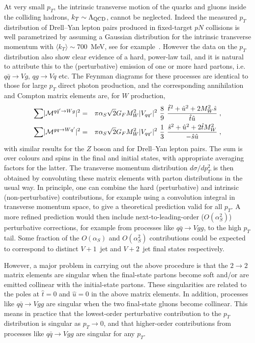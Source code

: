 \documentclass[12pt]{iopart}
\def\beqn{\begin{eqnarray}}
\def\eeqn{\end{eqnarray}}
\def\as{\alpha_S}
\begin{document}
At very small $p_T$, the intrinsic transverse motion of the quarks and gluons inside the colliding hadrons, $k_T
\sim \Lambda_{\rm QCD}$,  cannot be neglected. Indeed the measured $p_T$ distribution of Drell--Yan lepton pairs
produced in fixed-target $pN$ collisions is well parametrized by assuming a Gaussian distribution for the
intrinsic transverse momentum with  $\langle k_T\rangle \sim 700$~MeV, see for example~\cite{Ellis:1991qj}. 
However the data on the $p_T$ distribution also show clear evidence of a hard, power-law tail, and it is natural
to attribute this to the (perturbative) emission of one or more hard partons, i.e. $q \bar q \to V  g$, $q g \to
V q$ etc. The Feynman diagrams for these processes  are identical to those for large $p_T$ direct photon
production, and the corresponding annihilation and Compton matrix elements are, for $W$ production,
\beqn
\label{eq:sec2w1j}
 {\sum}\vert{\cal M}^{q\bar q'\rightarrow Wg}\vert^2  
&=& \pi\as \sqrt{2} G_F M^2_W \vert V_{qq'} \vert^2\ 
\frac{8}{9}\ {{\hat t}^2+{\hat u}^2+2 M_W^2 {\hat s} \over {\hat t} {\hat u} } \; , \nonumber \\
{\sum}\vert {\cal M}^{gq\rightarrow Wq'}\vert^2 
&=&  \pi\as \sqrt{2} G_F M^2_W \vert V_{qq'} \vert^2\  
\frac{1}{3}\ 
{{\hat s}^2+{\hat u}^2+2 {\hat t} M_W^2 \over - {\hat s} {\hat u} } \; ,
\eeqn
with similar results for the $Z$ boson and for Drell--Yan lepton pairs. The sum is over colours and spins in the
final and initial states, with appropriate averaging factors for the latter. The  transverse momentum
distribution $d\sigma/dp_T^2$  is then obtained by convoluting these matrix elements with parton distributions
in the usual way. In principle, one can combine the hard (perturbative) and intrinsic (non-perturbative)
contributions, for example using a convolution integral in transverse momentum space, to give a theoretical
prediction valid for all $p_T$. A more refined prediction would then include next-to-leading-order ($O(\as^2)$)
perturbative corrections, for example from processes like $q \bar q \to V gg$, to the high $p_T$ tail. Some
fraction of the $O(\as)$ and $O(\as^2)$ contributions could be expected to correspond to distinct $V+1$~jet and
$V+2$~jet final states respectively.

However, a major problem in carrying out the above procedure is that the $2\to 2$ matrix elements are singular
when the final-state partons become soft and/or are emitted collinear with the initial-state partons. These
singularities are related to the poles at ${\hat t}=0$ and ${\hat u}=0$ in the above matrix elements. In addition, processes
like $q \bar q \to V gg$ are singular when the two final-state gluons become collinear. This means in practice
that the lowest-order perturbative contribution to the $p_T$ distribution is singular as $p_T \to 0$, and that
higher-order contributions from processes like $q \bar q \to V gg$   are singular for any $p_T$.
\end{document}
